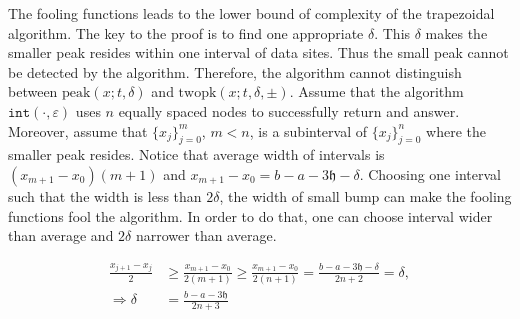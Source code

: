 \documentclass{iitthesis}
\theoremstyle{definition}
\theoremstyle{remark}
\begin{document}
The fooling functions leads to the lower bound of complexity of the trapezoidal algorithm. The key to the proof is to find one appropriate $\delta$.  This $\delta$ makes the smaller peak resides within one interval of data sites. Thus the small peak cannot be detected by the algorithm. Therefore, the algorithm cannot distinguish between $\text{peak}(x;t,\delta)$ and $\text{twopk}(x;t,\delta,\pm)$. Assume that the algorithm $\texttt{int}(\cdot,\varepsilon)$ uses $n$ equally spaced nodes to successfully return and answer. Moreover, assume that $\{x_{j}\}_{j=0}^{m}$, $m<n$, is a subinterval of $\{x_{j}\}_{j=0}^{n}$ where the smaller peak resides. Notice that average width of intervals is $(x_{m+1}-x_{0})(m+1)$ and $x_{m+1}-x_{0}=b-a-3\mathfrak{h}-\delta$. Choosing one interval such that the width is less than $2\delta$, the width of small bump can make the fooling functions fool the algorithm. In order to do that, one can choose interval wider than average and $2\delta$ narrower than average.

  \begin{align*}
    \frac{x_{j+1}-x_{j}}{2}&\ge\frac{x_{m+1}-x_{0}}{2(m+1)}\ge\frac{x_{m+1}-x_{0}}{2(n+1)}=\frac{b-a-3\mathfrak{h}-\delta}{2n+2}=\delta,\\
    \Rightarrow \delta&=\frac{b-a-3\mathfrak{h}}{2n+3}
  \end{align*}
\end{document}
